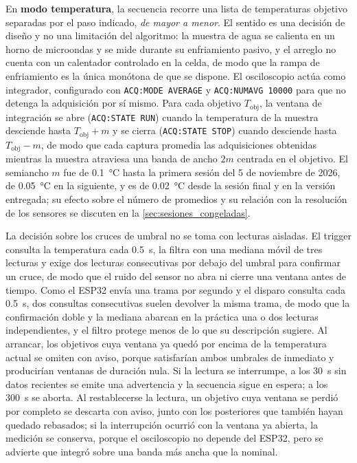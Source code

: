 En \textbf{modo temperatura}, la secuencia recorre una lista de
temperaturas objetivo separadas por el paso indicado, \emph{de mayor a
menor}. El sentido es una decisión de diseño y no una limitación del
algoritmo: la muestra de agua se calienta en un horno de microondas y se
mide durante su enfriamiento pasivo, y el arreglo no cuenta con un
calentador controlado en la celda, de modo que la rampa de enfriamiento
es la única monótona de que se dispone. El osciloscopio actúa como
integrador, configurado con \texttt{ACQ:MODE AVERAGE} y
\texttt{ACQ:NUMAVG 10000} para que no detenga la adquisición por sí
mismo. Para cada objetivo $T_\text{obj}$, la ventana de integración se
abre (\texttt{ACQ:STATE RUN}) cuando la temperatura de la muestra
desciende hasta $T_\text{obj} + m$ y se cierra
(\texttt{ACQ:STATE STOP}) cuando desciende hasta $T_\text{obj} - m$, de
modo que cada captura promedia las adquisiciones obtenidas mientras la
muestra atraviesa una banda de ancho $2m$ centrada en el objetivo. El
semiancho $m$ fue de \SI{0.1}{\celsius} hasta la primera sesión del 5
de noviembre de 2026, de \SI{0.05}{\celsius} en la siguiente, y es de
\SI{0.02}{\celsius} desde la sesión final y en la versión entregada; su efecto sobre el número de promedios y su relación con la
resolución de los sensores se discuten en la
\cref{sec:sesiones_congeladas}.

La decisión sobre los cruces de umbral no se toma con lecturas
aisladas. El trigger consulta la temperatura cada \SI{0.5}{\second},
la filtra con una mediana móvil de tres lecturas y exige dos lecturas
consecutivas por debajo del umbral para confirmar un cruce, de modo que
el ruido del sensor no abra ni cierre una ventana antes de tiempo.
Como el ESP32 envía una trama por segundo y el disparo consulta cada
\SI{0.5}{\second}, dos consultas consecutivas suelen devolver la misma
trama, de modo que la confirmación doble y la mediana abarcan en la
práctica una o dos lecturas independientes, y el filtro protege menos
de lo que su descripción sugiere. Al
arrancar, los objetivos cuya ventana ya quedó por encima de la
temperatura actual se omiten con aviso, porque satisfarían ambos
umbrales de inmediato y producirían ventanas de duración nula. Si la
lectura se interrumpe, a los \SI{30}{\second} sin datos recientes se
emite una advertencia y la secuencia sigue en espera; a los
\SI{300}{\second} se aborta. Al restablecerse la lectura, un objetivo
cuya ventana se perdió por completo se descarta con aviso, junto con
los posteriores que también hayan quedado rebasados; si la
interrupción ocurrió con la ventana ya abierta, la medición se
conserva, porque el osciloscopio no depende del ESP32, pero se advierte
que integró sobre una banda más ancha que la nominal.

